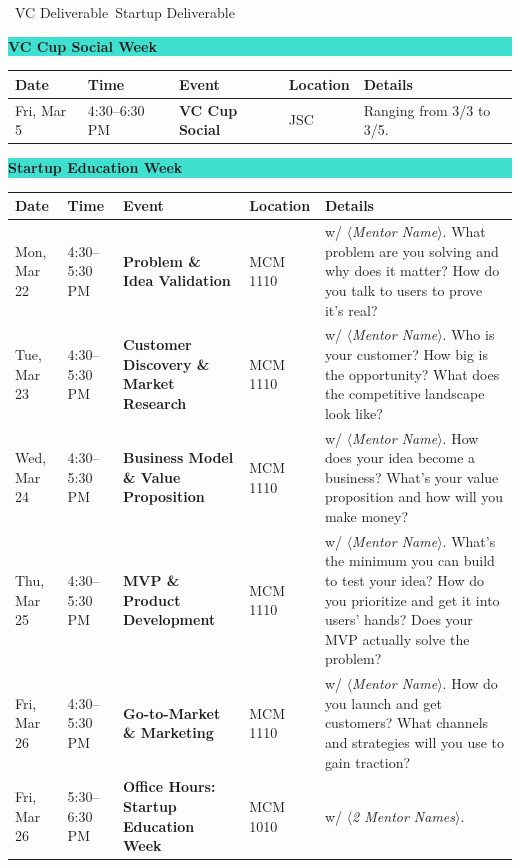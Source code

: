 \documentclass[11pt]{article}
\title{}
\date{}
\newcommand{\weekheader}[1]{%
  \vspace{4pt}
  \noindent
  \colorbox{turquoise}{\parbox{\dimexpr\textwidth-2\fboxsep}{\bfseries\large #1}}
  \vspace{6pt}
}
\newcommand{\entry}[5]{%
  #1 & #2 & \textbf{#3} & #4 & #5 \\
}
\newcommand{\legenditem}[2]{\raisebox{0.5pt}{\colorbox{#1}{\rule{0pt}{6pt}\rule{6pt}{0pt}}}~\small#2}
\begin{document}
\noindent\legenditem{trackvc}{VC Deliverable}\hspace{14pt}\legenditem{trackstartup}{Startup Deliverable}
\vspace{2pt}

\weekheader{VC Cup Social Week}
\begin{longtable}{L{2.2cm} L{2.2cm} L{4.5cm} L{1.7cm} L{4.7cm}}
\toprule
{}
\textbf{Date} & \textbf{Time} & \textbf{Event} & \textbf{Location} & \textbf{Details} \\
\midrule
\entry{Fri, Mar 5}{4:30--6:30 PM}{VC Cup Social}{JSC}{Ranging from 3/3 to 3/5.}
\bottomrule
\end{longtable}

\weekheader{Startup Education Week}
\begin{longtable}{L{2.2cm} L{2.2cm} L{4.5cm} L{1.7cm} L{4.7cm}}
\toprule
{}
\textbf{Date} & \textbf{Time} & \textbf{Event} & \textbf{Location} & \textbf{Details} \\
\midrule
\entry{Mon, Mar 22}{4:30--5:30 PM}{Problem \& Idea Validation}{MCM 1110}{w/ \textit{$\langle$Mentor Name$\rangle$}. What problem are you solving and why does it matter? How do you talk to users to prove it's real?}
\addlinespace
\entry{Tue, Mar 23}{4:30--5:30 PM}{Customer Discovery \& Market Research}{MCM 1110}{w/ \textit{$\langle$Mentor Name$\rangle$}. Who is your customer? How big is the opportunity? What does the competitive landscape look like?}
\addlinespace
\entry{Wed, Mar 24}{4:30--5:30 PM}{Business Model \& Value Proposition}{MCM 1110}{w/ \textit{$\langle$Mentor Name$\rangle$}. How does your idea become a business? What's your value proposition and how will you make money?}
\addlinespace
\entry{Thu, Mar 25}{4:30--5:30 PM}{MVP \& Product Development}{MCM 1110}{w/ \textit{$\langle$Mentor Name$\rangle$}. What's the minimum you can build to test your idea? How do you prioritize and get it into users' hands? Does your MVP actually solve the problem?}
\addlinespace
\entry{Fri, Mar 26}{4:30--5:30 PM}{Go-to-Market \& Marketing}{MCM 1110}{w/ \textit{$\langle$Mentor Name$\rangle$}. How do you launch and get customers? What channels and strategies will you use to gain traction?}
\addlinespace
\entry{Fri, Mar 26}{5:30--6:30 PM}{Office Hours: Startup Education Week}{MCM 1010}{w/ \textit{$\langle$2 Mentor Names$\rangle$}.}
\bottomrule
\end{longtable}
\end{document}
